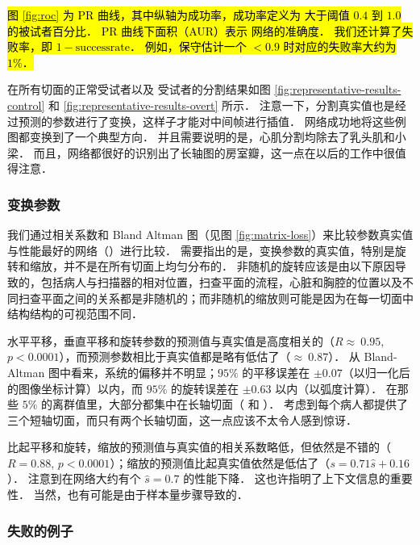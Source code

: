 \hl{
图 \ref{fig:roc} 为 PR 曲线，其中纵轴为成功率，成功率定义为 \IoU{} 大于阈值 $0.4$ 到 $1.0$ 的被试者百分比．
PR 曲线下面积（AUR）表示 \omeganet{} 网络的准确度．
我们还计算了失败率，即 $1 - \mathrm{success rate}$．
例如，保守估计一个 \IoU{} $< 0.9$ 时对应的失败率大约为 $1\%$．
}

\bestnetwork{} 在所有切面的正常受试者以及 \HCM{} 受试者的分割结果如图 \ref{fig:representative-results-control} 和 \ref{fig:representative-results-overt} 所示．
注意一下，分割真实值也是经过预测的参数进行了变换，这样子才能对中间帧进行插值．
网络成功地将这些例图都变换到了一个典型方向．
并且需要说明的是，心肌分割均除去了乳头肌和小梁．
而且，网络都很好的识别出了长轴图的房室瓣，这一点在以后的工作中很值得注意．





\subsubsection{变换参数}



我们通过相关系数和 Bland Altman 图（见图 \ref{fig:matrix-loss}）来比较参数真实值与性能最好的网络（\bestnetwork{}）进行比较．
需要指出的是，变换参数的真实值，特别是旋转和缩放，并不是在所有切面上均匀分布的．
非随机的旋转应该是由以下原因导致的，包括病人与扫描器的相对位置，扫查平面的流程，心脏和胸腔的位置以及不同扫查平面之间的关系都是非随机的；而非随机的缩放则可能是因为在每一切面中结构结构的可视范围不同．

水平平移，垂直平移和旋转参数的预测值与真实值是高度相关的（$R \approx~0.95$, $p < 0.0001$），而预测参数相比于真实值都是略有低估了（$\approx~0.87$）．
从 Bland-Altman 图中看来，系统的偏移并不明显；$95\%$ 的平移误差在 $\pm 0.07$（以归一化后的图像坐标计算）以内，而 $95\%$ 的旋转误差在 $\pm 0.63$ 以内（以弧度计算）．
在那些 $5\%$ 的离群值里，大部分都集中在长轴切面（\HLA{} 和 \VLA{}）．
考虑到每个病人都提供了三个短轴切面，而只有两个长轴切面，这一点应该不太令人感到惊讶．

比起平移和旋转，缩放的预测值与真实值的相关系数略低，但依然是不错的（$R = 0.88$, $p < 0.0001$）；缩放的预测值比起真实值依然是低估了（$s = 0.71\hat{s} + 0.16$）．
注意到在网络大约有个 $\hat{s} = 0.7$ 的性能下降．
这也许指明了上下文信息的重要性．
当然，也有可能是由于样本量步骤导致的．

\subsubsection{失败的例子}


